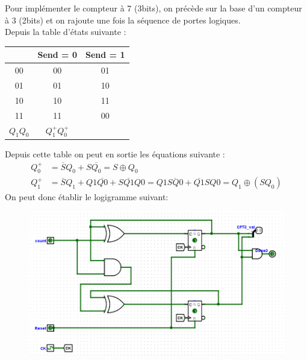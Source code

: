 \documentclass[a4paper]{article} %
\begin{document}
\begin{tcolorbox}[colframe=Monokaimagenta,colback=white, breakable, enhanced]
Pour implémenter le compteur à 7 (3bits), on précède sur la base d'un compteur à 3 (2bits) et on rajoute une fois la séquence de portes logiques.\\
Depuis la table d'états suivante :
\begin{center}
	\begin{tabular}{c|c|c}
			& 	Send = 0 &	Send = 1\\ \hline 
		00	&	00		 & 01 \\
		01	&	01	     & 10 \\
		10	&	10       & 11 \\
		11	&	11 		 & 00 \\
		$Q_1Q_0$&$Q_1^+Q_0^+$&\\
	\end{tabular}
\end{center}
Depuis cette table on peut en sortie les équations suivante : 
\begin{align*}
 Q_0^+ &= \overline{S}Q_0 + S \overline{Q_0} = S \oplus Q_0 \\
 Q_1^+ &= \overline{S}Q_1+Q1\overline{Q0} + S\overline{Q1}Q0 =  Q1\overline{SQ0} + \overline{Q1}SQ0= Q_1 \oplus (SQ_0) 
\end{align*}
On peut donc établir le logigramme suivant:
\begin{figure}[H]
	\centering
	\includegraphics[width=\textwidth]{src/CPT_03}
	\label{fig:CPT_03}
\end{figure}


\end{tcolorbox}
\end{document}
